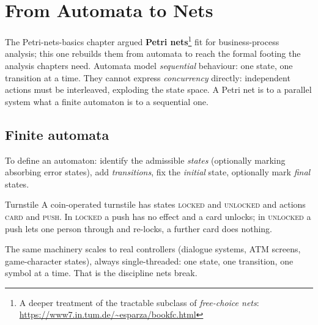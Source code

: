 \section{From Automata to Nets}

The Petri-nets-basics chapter argued \textbf{Petri nets}\footnote{A deeper treatment of the tractable subclass of \emph{free-choice nets}: \url{https://www7.in.tum.de/~esparza/bookfc.html}} fit for business-process analysis; this one rebuilds them from automata to reach the formal footing the analysis chapters need. Automata model \emph{sequential} behaviour: one state, one transition at a time. They cannot express \emph{concurrency} directly: independent actions must be interleaved, exploding the state space. A Petri net is to a parallel system what a finite automaton is to a sequential one.

\subsection{Finite automata}

To define an automaton: identify the admissible \emph{states} (optionally marking absorbing error states), add \emph{transitions}, fix the \emph{initial} state, optionally mark \emph{final} states.

\begin{examplebox}{Turnstile}
A coin-operated turnstile has states \textsc{locked} and \textsc{unlocked} and actions \textsc{card} and \textsc{push}. In \textsc{locked} a push has no effect and a card unlocks; in \textsc{unlocked} a push lets one person through and re-locks, a further card does nothing.
\begin{center}
\end{center}
\end{examplebox}

The same machinery scales to real controllers (dialogue systems, ATM screens, game-character states), always single-threaded: one state, one transition, one symbol at a time. That is the discipline nets break.

